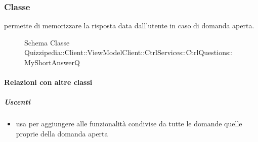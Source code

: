 \subsubsection{Classe }
permette di memorizzare la risposta data dall'utente in caso di domanda aperta.
\begin{figure}[H]
\centering
\noindent{}
\caption[Schema Classe MyShortAnswerQ]{Schema Classe Quizzipedia::Client::ViewModelClient::CtrlServices::CtrlQuestions::MyShortAnswerQ}
\end{figure}
\paragraph{Relazioni con altre classi}
\subparagraph{Uscenti}
\begin{itemize}
\item usa  per aggiungere alle funzionalità condivise da tutte le domande quelle proprie della domanda aperta
\end{itemize}
